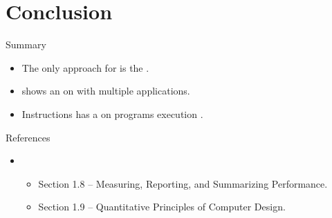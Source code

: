 \section{Conclusion}

\begin{frame}[t]{Summary}
\begin{itemize}
  \item The only  approach for 
        is the .

  \item {} shows an  on 
        with multiple applications.

  \item Instructions  has a  on
        programs execution .
\end{itemize}
\end{frame}

\begin{frame}[t]{References}
\begin{itemize}
  \item \credithennessy
    \begin{itemize}
      \item Section 1.8 -- Measuring, Reporting, and Summarizing Performance.
      \item Section 1.9 -- Quantitative Principles of Computer Design.
    \end{itemize}
\end{itemize}
\end{frame}

